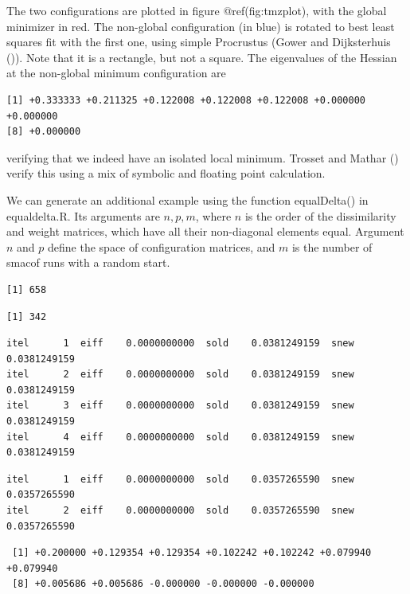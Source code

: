 \documentclass[
  12pt,
  letterpaper,
  DIV=11,
  numbers=noendperiod]{scrreprt}
\theoremstyle{remark}
\begin{document}
The two configurations are plotted in figure @ref(fig:tmzplot), with the
global minimizer in red. The non-global configuration (in blue) is
rotated to best least squares fit with the first one, using simple
Procrustus (Gower and Dijksterhuis
()). Note that it is a
rectangle, but not a square. The eigenvalues of the Hessian at the
non-global minimum configuration are

\begin{verbatim}
[1] +0.333333 +0.211325 +0.122008 +0.122008 +0.122008 +0.000000 +0.000000
[8] +0.000000
\end{verbatim}

verifying that we indeed have an isolated local minimum. Trosset and
Mathar () verify this using a mix
of symbolic and floating point calculation.

We can generate an additional example using the function equalDelta() in
equaldelta.R. Its arguments are \(n, p, m\), where \(n\) is the order of
the dissimilarity and weight matrices, which have all their non-diagonal
elements equal. Argument \(n\) and \(p\) define the space of
configuration matrices, and \(m\) is the number of smacof runs with a
random start.

\begin{verbatim}
[1] 658
\end{verbatim}

\begin{verbatim}
[1] 342
\end{verbatim}

\begin{verbatim}
itel      1  eiff    0.0000000000  sold    0.0381249159  snew    0.0381249159  
itel      2  eiff    0.0000000000  sold    0.0381249159  snew    0.0381249159  
itel      3  eiff    0.0000000000  sold    0.0381249159  snew    0.0381249159  
itel      4  eiff    0.0000000000  sold    0.0381249159  snew    0.0381249159  
\end{verbatim}

\begin{verbatim}
itel      1  eiff    0.0000000000  sold    0.0357265590  snew    0.0357265590  
itel      2  eiff    0.0000000000  sold    0.0357265590  snew    0.0357265590  
\end{verbatim}

\begin{verbatim}
 [1] +0.200000 +0.129354 +0.129354 +0.102242 +0.102242 +0.079940 +0.079940
 [8] +0.005686 +0.005686 -0.000000 -0.000000 -0.000000
\end{verbatim}
\end{document}

